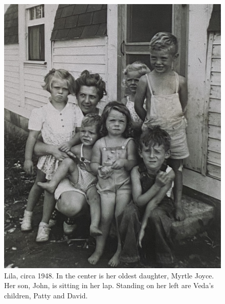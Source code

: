 \documentclass[
  letterpaper,
]{book}
\begin{document}
\begin{figure}[H]

{\centering \includegraphics[width=0.75\linewidth,height=\textheight,keepaspectratio]{images/Akou16.JPG}

}

\caption[Lila, circa 1948.]{Lila, circa 1948. In the center is her
oldest daughter, Myrtle Joyce. Her son, John, is sitting in her lap.
Standing on her left are Veda's children, Patty and David.}

\end{figure}%
\end{document}
